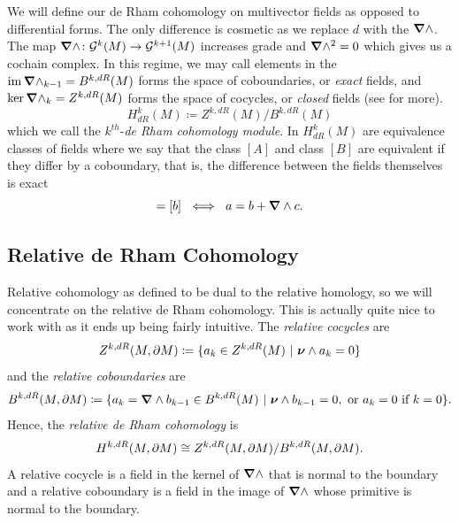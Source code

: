 \documentclass{article}
\begin{document}
We will define our de Rham cohomology on multivector fields as opposed to differential forms. The only difference is cosmetic as we replace $d$ with the $\boldsymbol{\nabla} \wedge$. The map $\boldsymbol{\nabla} \wedge \colon \mathcal{G}^k(M) \to \mathcal{G}^{k+1}(M)$ increases grade and $\boldsymbol{\nabla} \wedge ^2=0$ which gives us a cochain complex. In this regime, we may call elements in the $\operatorname{im} \boldsymbol{\nabla}\wedge_{k-1} = B^{k,dR}(M)$ forms the space of coboundaries, or \emph{exact} fields, and $\ker \boldsymbol{\nabla}\wedge_{k} = Z^{k,dR}(M)$ forms the space of cocycles, or \emph{closed} fields (see \cite{schwarz_hodge_1995} for more). 
\begin{equation}
H^k_{dR}(M) \coloneqq Z^{k,dR}(M)/B^{k,dR}(M)
\end{equation}
which we call the $k^{th}$-\emph{de Rham cohomology module}. In $H^k_{dR}(M)$ are equivalence classes of fields where we say that the class $[A]$ and class $[B]$ are equivalent if they differ by a coboundary, that is, the difference between the fields themselves is exact
\begin{equation}
[a]=[b] ~ \iff ~ a=b+\grad \wedge c.
\end{equation}


\subsection{Relative de Rham Cohomology}

Relative cohomology as defined to be dual to the relative homology, so we will concentrate on the relative de Rham cohomology. This is actually quite nice to work with as it ends up being fairly intuitive. The \emph{relative cocycles} are
\begin{equation}
    Z^{k,dR}(M,{\partial M}) \coloneqq \{ a_k \in Z^{k,dR}(M) ~\vert ~ \boldsymbol{\nu} \wedge a_k =0\}
\end{equation}
and the \emph{relative coboundaries} are
\begin{equation}
    B^{k,dR}(M,{\partial M}) \coloneqq \{ a_k = \boldsymbol{\nabla} \wedge b_{k-1} \in B^{k,dR}(M) ~\vert ~ \boldsymbol{\nu} \wedge b_{k-1} =0, ~\textrm{or $a_k=0$ if $k=0$}\}.
\end{equation}
Hence, the \emph{relative de Rham cohomology} is
\begin{equation}
    H^{k,dR}(M,{\partial M}) \cong Z^{k,dR}(M,{\partial M})/B^{k,dR}(M,{\partial M}).
\end{equation}
A relative cocycle is a field in the kernel of $\boldsymbol{\nabla} \wedge$ that is normal to the boundary and a relative coboundary is a field in the image of $\boldsymbol{\nabla} \wedge$ whose primitive is normal to the boundary. 
\end{document}
